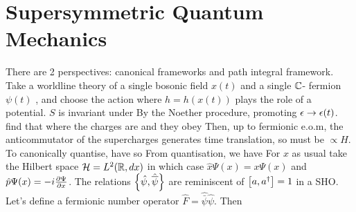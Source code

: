 \documentclass{article}
\begin{document}
\section{Supersymmetric Quantum Mechanics}
There are 2 perspectives: canonical frameworks and path integral framework. \\
Take a worldline theory of a single bosonic field $x(t)$ and a single $\mbb{C}$- fermion $\psi(t)$
, and choose the action 
where $h=h(x(t))$ plays the role of a potential. $S$ is invariant under 
By the Noether procedure, promoting $\eps \to \eps(t)$. find that 
where the charges are 
and they obey
Then, up to fermionic e.o.m, the anticommutator of the supercharges generates time translation, so must be $\propto H$. \\
To canonically quantise, have 
so 
From quantisation, we have 
For $x$ as usual take the Hilbert space $\mc{H} = L^2 ( \mbb{R}, dx)$ in which case $\hat{x} \Psi(x) = x\Psi(x)$ and $\hat{p} \Psi(x) = -i \pd[\Psi]{x}$. The relations $\acomm[\hat{\psi}]{\hat{\bar{\psi}}}$ are reminiscent of $\comm[a]{a^\dagger}=1$ in a SHO. Let's define a fermionic number operator $\hat{F} = \hat{\bar{\psi}}\hat{\psi}$. Then 
\end{document}
